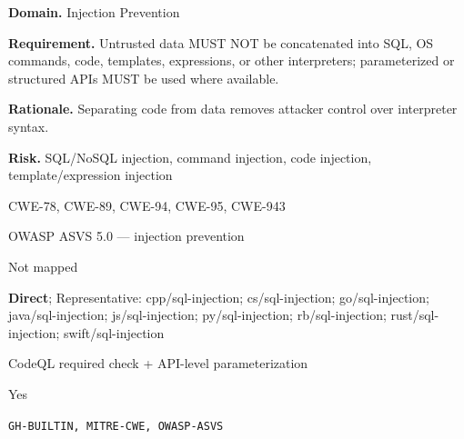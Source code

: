 \documentclass[10pt,letterpaper]{article}
\newcommand{\prioritybadge}[2]{\tcbox[on line,boxrule=0pt,arc=1.2mm,boxsep=0.7mm,left=1mm,right=1mm,top=0.4mm,bottom=0.4mm,colback=#2!12,coltext=#2]{\scriptsize\bfseries #1}}
\begin{document}
\begin{rulebox}[title={\texttt{SCS-ALL-INJ-001} \hfill \prioritybadge{Critical Control}{Critical}}]
\textbf{Domain.} Injection Prevention

\textbf{Requirement.} Untrusted data MUST NOT be concatenated into SQL, OS commands, code, templates, expressions, or other interpreters; parameterized or structured APIs MUST be used where available.

\textbf{Rationale.} Separating code from data removes attacker control over interpreter syntax.

\textbf{Risk.} SQL/NoSQL injection, command injection, code injection, template/expression injection

\begin{description}[leftmargin=2.65cm,labelwidth=2.3cm,style=nextline,itemsep=1pt,topsep=3pt]
  \item[CWE] CWE-78, CWE-89, CWE-94, CWE-95, CWE-943
  \item[OWASP] OWASP ASVS 5.0 --- injection prevention
  \item[CERT] Not mapped
  \item[CodeQL] \textbf{Direct}; Representative: cpp/sql-injection; cs/sql-injection; go/sql-injection; java/sql-injection; js/sql-injection; py/sql-injection; rb/sql-injection; rust/sql-injection; swift/sql-injection
  \item[Enforcement] CodeQL required check + API-level parameterization
  \item[Automation] Yes
  \item[Sources] \texttt{GH-BUILTIN, MITRE-CWE, OWASP-ASVS}
\end{description}
\end{rulebox}
\end{document}
